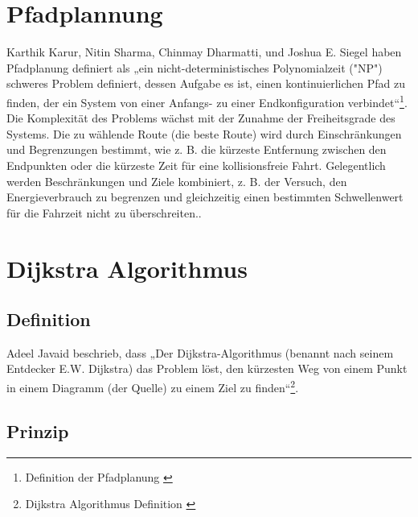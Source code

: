 \section{Pfadplannung}

Karthik Karur, Nitin Sharma, Chinmay Dharmatti, und Joshua E. Siegel haben Pfadplanung definiert als „ein nicht-deterministisches Polynomialzeit ("NP") schweres Problem definiert, dessen Aufgabe es ist, einen kontinuierlichen Pfad zu finden, der ein System von einer Anfangs- zu einer Endkonfiguration verbindet“\footnote{Definition der Pfadplanung \cite{vehicles3030027}}.
\newline
\newline
Die Komplexität des Problems wächst mit der Zunahme der Freiheitsgrade des Systems. Die zu wählende Route (die beste Route) wird durch Einschränkungen und Begrenzungen bestimmt, wie z. B. die kürzeste Entfernung zwischen den Endpunkten oder die kürzeste Zeit für eine kollisionsfreie Fahrt. Gelegentlich werden Beschränkungen und Ziele kombiniert, z. B. der Versuch, den Energieverbrauch zu begrenzen und gleichzeitig einen bestimmten Schwellenwert für die Fahrzeit nicht zu überschreiten.\cite{vehicles3030027}.



\section{Dijkstra Algorithmus}

\subsection{Definition}

Adeel Javaid beschrieb, dass „Der Dijkstra-Algorithmus (benannt nach seinem Entdecker E.W. Dijkstra) das Problem löst, den kürzesten Weg von einem Punkt in einem Diagramm (der Quelle) zu einem Ziel zu finden“\footnote{Dijkstra Algorithmus Definition \cite{SSRN-id2340905}}.

\subsection{Prinzip}

